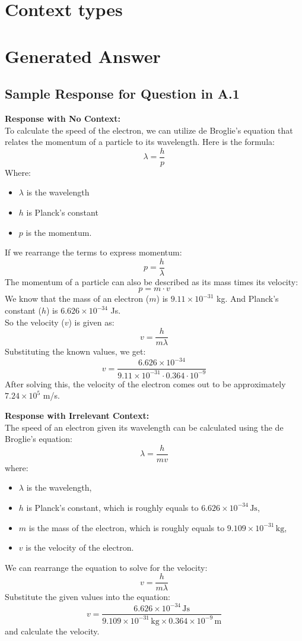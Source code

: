 \documentclass{article}
\begin{document}
\section{Context types}

\section{Generated Answer}
\subsection{Sample Response for Question in A.1}

\textbf{Response with No Context:} \\
To calculate the speed of the electron, we can utilize de Broglie's equation that relates the momentum of a particle to its wavelength. Here is the formula:
\[
\lambda = \frac{h}{p}
\]
Where:
\begin{itemize}
    \item \( \lambda \) is the wavelength
    \item \( h \) is Planck's constant
    \item \( p \) is the momentum.
\end{itemize}
If we rearrange the terms to express momentum:
\[
p = \frac{h}{\lambda}
\]
The momentum of a particle can also be described as its mass times its velocity:
\[
p = m \cdot v
\]
We know that the mass of an electron (\( m \)) is \( 9.11 \times 10^{-31} \) kg. And Planck's constant (\( h \)) is \( 6.626 \times 10^{-34} \) Js. \\
So the velocity (\( v \)) is given as:
\[
v = \frac{h}{m\lambda}
\]
Substituting the known values, we get:
\[
v = \frac{6.626 \times 10^{-34}}{9.11 \times 10^{-31} \cdot 0.364 \cdot 10^{-9}}
\]
After solving this, the velocity of the electron comes out to be approximately \( 7.24 \times 10^5 \) m/s.

\bigskip

\textbf{Response with Irrelevant Context:} \\
The speed of an electron given its wavelength can be calculated using the de Broglie's equation:
\[
\lambda = \frac{h}{mv}
\]
where:
\begin{itemize}
    \item \( \lambda \) is the wavelength,
    \item \( h \) is Planck's constant, which is roughly equals to \( 6.626 \times 10^{-34} \, \text{Js} \),
    \item \( m \) is the mass of the electron, which is roughly equals to \( 9.109 \times 10^{-31} \, \text{kg} \),
    \item \( v \) is the velocity of the electron.
\end{itemize}
We can rearrange the equation to solve for the velocity:
\[
v = \frac{h}{m\lambda}
\]
Substitute the given values into the equation:
\[
v = \frac{6.626 \times 10^{-34} \, \text{Js}}{9.109 \times 10^{-31} \, \text{kg} \times 0.364 \times 10^{-9} \, \text{m}}
\]
and calculate the velocity.
\end{document}
